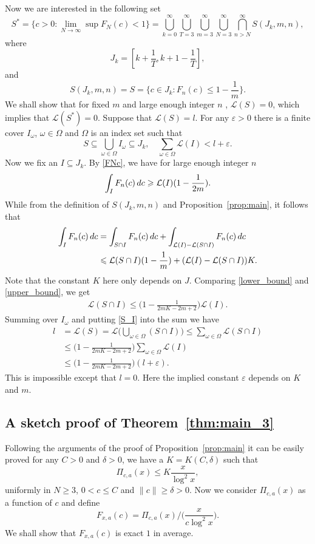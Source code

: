 \documentclass[12pt, reqno, twoside, letterpaper]{amsart}
\numberwithin{equation}{section}
\def\eps{\varepsilon}
\newcommand{\cL}{\ensuremath{\mathcal{L}}}
\theoremstyle{customthm}
\theoremstyle{customrem}
\def\int{\intop\nolimits}
\begin{document}
Now we are interested in the following set
$$
S^*=\{ c>0: \lim\limits_{N\rightarrow\infty }\sup F_N(c)<1 \}=\bigcup_{k=0}^{\infty}\bigcup_{T=3}^{\infty}\bigcup_{m=3}^{\infty}\bigcup_{N=3}^{\infty}\bigcap_{n>N}^{\infty}S(J_k,m,n),
$$
where
\begin{equation}
\label{eq:jk}
J_k=[k+\frac{1}{T},k+1-\frac{1}{T}],
\end{equation}
and
$$
S(J_k,m,n)=S=\{ c\in J_k: F_n(c)\leqslant 1-\frac{1}{m} \}.
$$
We shall show that for fixed $m$ and large enough integer $n$ , $\cL(S) = 0$, which implies that $\cL(S^*) = 0$. Suppose that $\cL(S)=l$. For any $\eps>0$ there is a finite cover $I_{\omega}$, $\omega\in\Omega$ and $\Omega$ is an index set such that
$$
S\subseteq \bigcup_{\omega\in\Omega}I_{\omega}\subseteq J_k,\quad \sum_{\omega\in\Omega} \cL(I)<l+\eps.
$$
Now we fix an $I\subseteq J_k$. By \eqref{FNc}, we have for large enough integer $n$ 
\begin{equation}
	\label{lower_bound}
\int_{I}F_n(c)\,dc\geqslant\cL(I)(1-\frac{1}{2m}).
\end{equation}
While from the definition of $S(J_k,m,n)$ and Proposition~\ref{prop:main}, it follows that
\begin{align}
	\label{upper_bound}
\nonumber \int_{I}F_n(c)\, dc &= \int_{S\cap I}F_n(c)\, dc + \int_{\cL(I)-\cL(S\cap I)}F_n(c)\,dc \\
&\leqslant \cL(S\cap I)(1-\frac{1}{m})+(\cL(I)-\cL(S\cap I))K.
\end{align}
Note that the constant $K$ here only depends on $J$. Comparing \eqref{lower_bound} and \eqref{upper_bound}, we get
\begin{align}
	\label{S_I}
\cL(S\cap I)\leqslant \big( 1-\frac{1}{2mK-2m+2} \big)\cL(I).
\end{align}
Summing over $I_{\omega}$ and putting \eqref{S_I} into the sum we have
\begin{align*}
l&=\cL(S)=\cL\big(\bigcup_{\omega\in\Omega}(S\cap I)\big)\leqslant \sum_{\omega\in\Omega}\cL(S\cap I) \\
&\leqslant\big( 1-\frac{1}{2mK-2m+2} \big)\sum_{\omega\in\Omega}\cL(I)\\
&\leqslant \big( 1-\frac{1}{2mK-2m+2} \big)(l+\eps).
\end{align*}
This is impossible except that $l=0$. Here the implied constant $\varepsilon$ depends on $K$ and $m$. 


\subsection{A sketch proof of Theorem~\ref{thm:main_3}}
Following the arguments of the proof of Proposition~\ref{prop:main} it can be easily proved for any $C>0$ and $\delta>0$, we have a $K=K(C,\delta)$ such that
$$
\Pi_{c,a}(x)\leqslant K\frac{x}{\log ^2 x},
$$ 
uniformly in $N\geqslant 3$, $0<c\leqslant C$ and $\| c \|\geqslant \delta>0$. Now we consider $\Pi_{c,a}(x)$ as a function of $c$ and define
\begin{equation}
\label{eq:Fup}
F_{x,a}(c)=\Pi_{c,a}(x)\bigg/ \big(\frac{x}{c\log ^2x}\big).
\end{equation}
We shall show that $F_{x,a}(c)$ is exact $1$ in average. 
\end{document}
